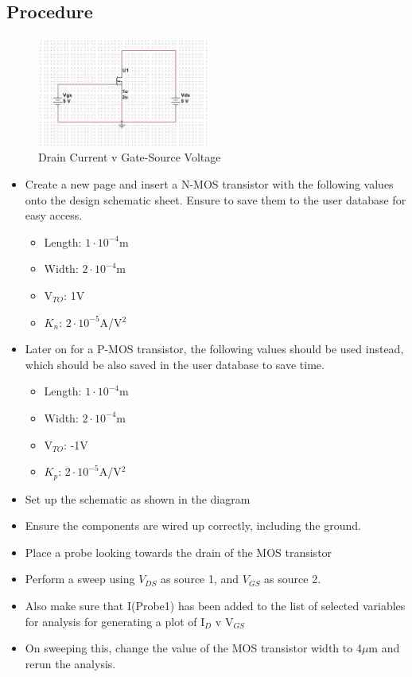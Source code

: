 \documentclass[12pt]{article}
\begin{document}
\subsection{Procedure}
\begin{figure}[H]
\centering
\includegraphics[width=0.5\textwidth]{2.jpg}
\caption{Drain Current v Gate-Source Voltage}
\end{figure}
\begin{itemize}
\item Create a new page and insert a N-MOS transistor with the following values onto the design schematic sheet. Ensure to save them to the user database for easy access.
\begin{itemize}
\item Length: $1\cdot10^{-4}$m
\item Width: $2\cdot10^{-4}$m
\item V$_{TO}$: 1V
\item $K_n$: $2\cdot10^{-5}$A/V${^2}$
\end{itemize}
\item Later on for a P-MOS transistor, the following values should be used instead, which should be also saved in the user database to save time.
\begin{itemize}
\item Length: $1\cdot10^{-4}$m
\item Width: $2\cdot10^{-4}$m
\item V$_{TO}$: -1V
\item $K_p$: $2\cdot10^{-5}$A/V${^2}$
\end{itemize}
\item Set up the schematic as shown in the diagram
\item Ensure the components are wired up correctly, including the ground.
\item Place a probe looking towards the drain of the MOS transistor
\item Perform a sweep using $V_{DS}$ as source 1, and $V_{GS}$ as source 2.
\item Also make sure that I(Probe1) has been added to the list of selected variables for analysis for generating a plot of I$_D$ v V$_{GS}$
\item On sweeping this, change the value of the MOS transistor width to 4$\mu$m and rerun the analysis.
\end{itemize}
\end{document}

